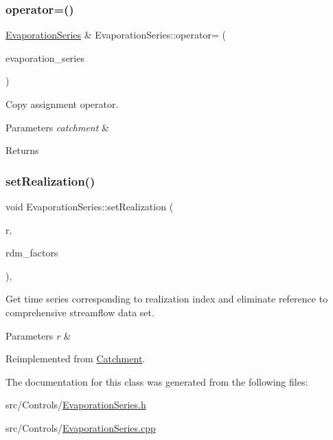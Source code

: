 \subsubsection{\texorpdfstring{operator=()}{operator=()}}
{\footnotesize\ttfamily \mbox{\hyperlink{classEvaporationSeries}{Evaporation\+Series}} \& Evaporation\+Series\+::operator= (\begin{DoxyParamCaption}\item[{const \mbox{\hyperlink{classEvaporationSeries}{Evaporation\+Series}} \&}]{evaporation\+\_\+series }\end{DoxyParamCaption})}

Copy assignment operator. 
\begin{DoxyParams}{Parameters}
{\em catchment} & \\
\hline
\end{DoxyParams}
\begin{DoxyReturn}{Returns}

\end{DoxyReturn}
\mbox{\label{classEvaporationSeries_a4985ac4c81ec111657861e5750b24c0e_a4985ac4c81ec111657861e5750b24c0e}} 
\subsubsection{\texorpdfstring{set\+Realization()}{setRealization()}}
{\footnotesize\ttfamily void Evaporation\+Series\+::set\+Realization (\begin{DoxyParamCaption}\item[{unsigned long}]{r,  }\item[{vector$<$ double $>$ \&}]{rdm\+\_\+factors }\end{DoxyParamCaption})\hspace{0.3cm}{\ttfamily [override]}, {\ttfamily [virtual]}}

Get time series corresponding to realization index and eliminate reference to comprehensive streamflow data set. 
\begin{DoxyParams}{Parameters}
{\em r} & \\
\hline
\end{DoxyParams}


Reimplemented from \mbox{\hyperlink{classCatchment_affb9042c5854a76efd864ce87d7d1877_affb9042c5854a76efd864ce87d7d1877}{Catchment}}.



The documentation for this class was generated from the following files\+:\begin{DoxyCompactItemize}
\item 
src/\+Controls/\mbox{\hyperlink{EvaporationSeries_8h}{Evaporation\+Series.\+h}}\item 
src/\+Controls/\mbox{\hyperlink{EvaporationSeries_8cpp}{Evaporation\+Series.\+cpp}}\end{DoxyCompactItemize}
